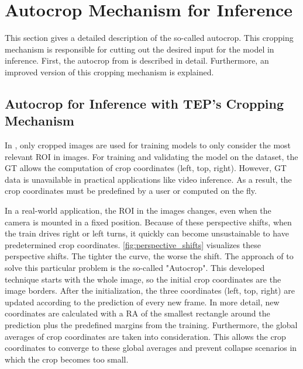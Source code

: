 \section{Autocrop Mechanism for Inference}
\label{sec:autocrop}

This section gives a detailed description of the so-called autocrop.
This cropping mechanism is responsible for cutting out the desired input for the model in inference.
First, the autocrop from \cite{tepNet2024} is described in detail.
Furthermore, an improved version of this cropping mechanism is explained.

\subsection{Autocrop for Inference with TEP's Cropping Mechanism}

In \cite{tepNet2024}, only cropped images are used for training models to only consider the most relevant \ac{ROI} in images.
For training and validating the model on the dataset, the \ac{GT} allows the computation of crop coordinates (left, top, right).
However, \ac{GT} data is unavailable in practical applications like video inference.
As a result, the crop coordinates must be predefined by a user or computed on the fly.

In a real-world application, the \ac{ROI} in the images changes, even when the camera is mounted in a fixed position.
Because of these perspective shifts, when the train drives right or left turns, it quickly can become unsustainable to have predetermined crop coordinates.
\autoref{fig:perspective_shifts} visualizes these perspective shifts.
The tighter the curve, the worse the shift.
The approach of \cite{tepNet2024} to solve this particular problem is the so-called "Autocrop".
This developed technique starts with the whole image, so the initial crop coordinates are the image borders.
After the initialization, the three coordinates (left, top, right) are updated according to the prediction of every new frame.
In more detail, new coordinates are calculated with a \ac{RA} of the smallest rectangle around the prediction plus the predefined margins from the training.
Furthermore, the global averages of crop coordinates are taken into consideration.
This allows the crop coordinates to converge to these global averages and prevent collapse scenarios in which the crop becomes too small.


